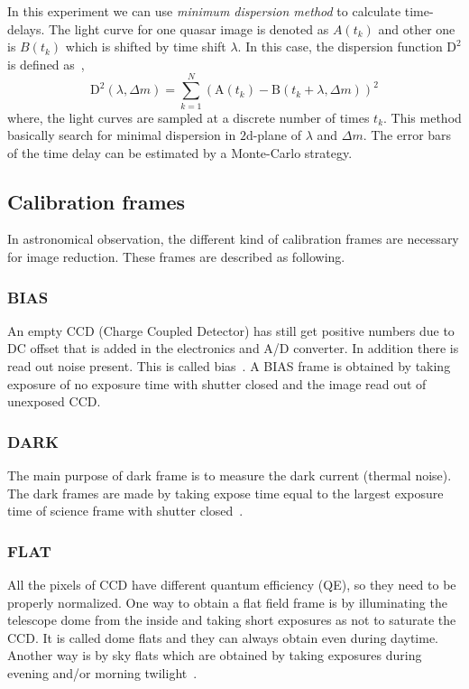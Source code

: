 \noindent
In this experiment we can use \textit{minimum dispersion method} to calculate time-delays. The light curve for one quasar image is denoted as $ A(t_{k}) $ and other one is $ B(t_{k}) $ which is shifted by time shift $ \lambda $. In this case, the dispersion function $ \text{D}^2 $ is defined as~\cite{manual},
\begin{equation}
\text{D}^2(\lambda, \Delta m)=\sum_{k=1}^{N}(\text{A}(t_{k}) - \text{B}(t_{k}+\lambda, \Delta m) )^2
\end{equation}
where, the light curves are sampled at a discrete number of times $ t_{k}$. This method basically search for minimal dispersion in $2$d-plane of $\lambda$ and $\Delta m$.
The error bars of the time delay can be estimated by a Monte-Carlo strategy.


\subsection{Calibration frames}
In astronomical observation, the different kind of calibration frames are necessary for image reduction. These frames are described as following.

\subsubsection{BIAS}
An empty CCD (Charge Coupled Detector) has still get positive numbers due to DC offset that is added in the electronics and A/D converter. In addition there is read out noise present. This is called bias~\cite{manual}. 
A BIAS frame is obtained by taking exposure of no exposure time with shutter closed and the image read out of unexposed CCD. 

\subsubsection{DARK}
The main purpose of dark frame is to measure the dark current (thermal noise). The dark frames are made by taking expose time equal to the largest exposure time of science frame with shutter closed~\cite{manual}. 

\subsubsection{FLAT}
All the pixels of CCD have different quantum efficiency (QE), so they need to be properly normalized. One way to obtain a flat field frame is by illuminating the telescope dome from the inside and taking short exposures as not to saturate the CCD. It is called dome flats and they can always obtain even during daytime. Another way is by sky flats which are obtained by taking exposures during evening and/or morning twilight~\cite{manual}. 

